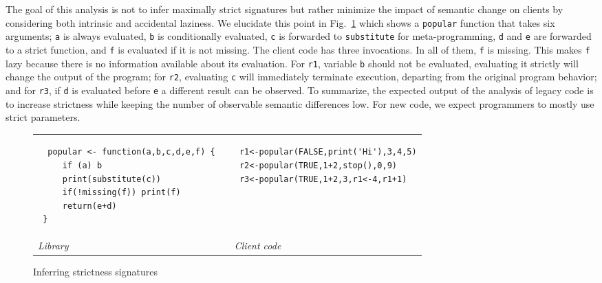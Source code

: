 \documentclass[review,screen,acmsmall]{acmart}
\renewcommand{\c}[1]{\lstinline |#1|\xspace}
\begin{document}
The goal of this analysis is not to infer maximally strict signatures but rather
minimize the impact of semantic change on clients by considering both intrinsic
and accidental laziness. We elucidate this point in Fig.~\ref{iss} which
shows a \c{popular} function that takes six arguments; \c{a} is always
evaluated, \c{b} is conditionally evaluated, \c{c} is forwarded to
\c{substitute} for meta-programming, \c{d} and \c{e} are forwarded to a
strict function, and \c{f} is evaluated if it is not missing. The client code
has three invocations. In all of them, \c{f} is missing. This makes \c{f}
lazy because there is no information available about its evaluation. For \c{r1},
variable \c b should not be evaluated, evaluating it strictly will change the
output of the program; for \c{r2}, evaluating \c{c} will immediately
terminate execution, departing from the original program behavior; and for
\c{r3}, if \c{d} is evaluated before \c{e} a different result can be observed.
To summarize, the expected output of the analysis of legacy code is to increase
strictness while keeping the number of observable semantic differences low. For
new code, we expect programmers to mostly use strict parameters.

\begin{figure}[!h]
  \begin{tabular}{lll}
    \begin{minipage}{6cm}
\begin{lstlisting}
  popular <- function(a,b,c,d,e,f) {
     if (a) b
     print(substitute(c))
     if(!missing(f)) print(f)
     return(e+d)
 }
\end{lstlisting}

    \end{minipage}
    &&
       \begin{minipage}{6cm}
\begin{lstlisting}
 r1<-popular(FALSE,print('Hi'),3,4,5)
 r2<-popular(TRUE,1+2,stop(),0,9)
 r3<-popular(TRUE,1+2,3,r1<-4,r1+1)
\end{lstlisting}
       \end{minipage}\\
    {\it Library}&&{\it Client code}
  \end{tabular}%
  \caption{Inferring strictness signatures}\label{iss} %
\end{figure}
\end{document}
